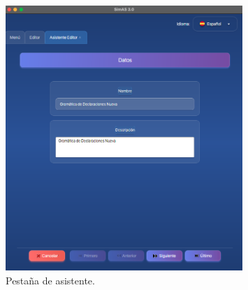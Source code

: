 \begin{figure}[htp]
\centering
	\includegraphics[width=0.8\textwidth]{figuras2/ejemplo_practico/editor_paso1.png}
	\caption{Pestaña de asistente.}
	\label{fig:d8}
\end{figure}